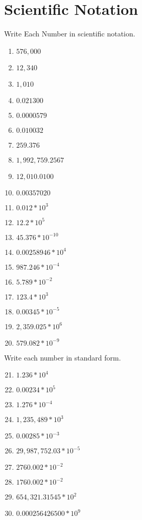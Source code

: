 \section{Scientific Notation}
Write Each Number in scientific notation.
\begin{enumerate}
\item $576,000$
\item $12,340$
\item $1,010$
\item $0.021300$
\item $0.0000579$
\item $0.010032$
\item $259.376$
\item $1,992,759.2567$
\item $12,010.0100$
\item $0.00357020$
\item $0.012*10^{3}$
\item $12.2*10^{5}$
\item $45.376*10^{-10}$
\item $0.00258946*10^{4}$
\item $987.246*10^{-4}$
\item $5.789*10^{-2}$
\item $123.4*10^{3}$
\item $0.00345*10^{-5}$
\item $2,359.025*10^{6}$
\item $579.082*10^{-9}$
\end{enumerate}
Write each number in standard form.
\begin{enumerate}
\setcounter{enumi}{20}
\item $1.236*10^{4}$
\item $0.00234*10^{5}$
\item $1.276*10^{-4}$
\item $1,235,489*10^{3}$
\item $0.00285*10^{-3}$
\item $29,987,752.03*10^{-5}$
\item $2760.002*10^{-2}$
\item $1760.002*10^{-2}$
\item $654,321.31545*10^{2}$
\item $0.000256426500*10^{9}$
\end{enumerate}
